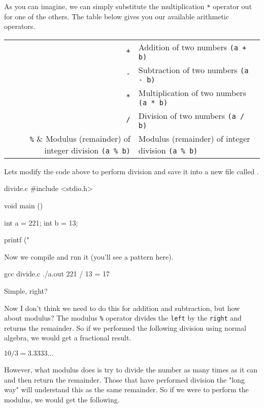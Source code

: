 As you can imagine, we can simply substitute the multiplication \verb|*|
operator out for one of the others. The table below gives you our available
arithmetic operators.

\begin{center}
\begin{tabular}{r l}
\hline
\verb|+| & Addition of two numbers \verb|(a + b)| \\
\verb|-| & Subtraction of two numbers \verb|(a - b)| \\
\verb|*| & Multiplication of two numbers \verb|(a * b)| \\
\verb|/| & Division of two numbers \verb|(a / b)| \\
\verb|%| & Modulus (remainder) of integer division \verb|(a % b)| \\
\hline
\end{tabular}
\end{center}

Lets modify the code above to perform division and save it into a new file
called .

\begin{code}{divide.c}
#include <stdio.h>

void main ()
{
    int a = 221;
    int b = 13;

    printf ("%
}
\end{code}

Now we compile  and run it (you'll see a pattern here).

\begin{Terminal}
gcc divide.c
./a.out
221 / 13 = 17
\end{Terminal}

Simple, right?

Now I don't think we need to do this for addition and subtraction, but how about
modulus? The modulus \verb|%| operator divides the \verb|left| by the
\verb|right| and returns the remainder. So if we performed the following
division using normal algebra, we would get a fractional result.

\begin{center}
\begin{math}
10 / 3 = 3.3333...
\end{math}
\end{center}

However, what modulus does is try to divide the number as many times as it can
and then return the remainder. Those that have performed division the "long way"
will understand this as the same remainder. So if we were to perform the
modulus, we would get the following.

